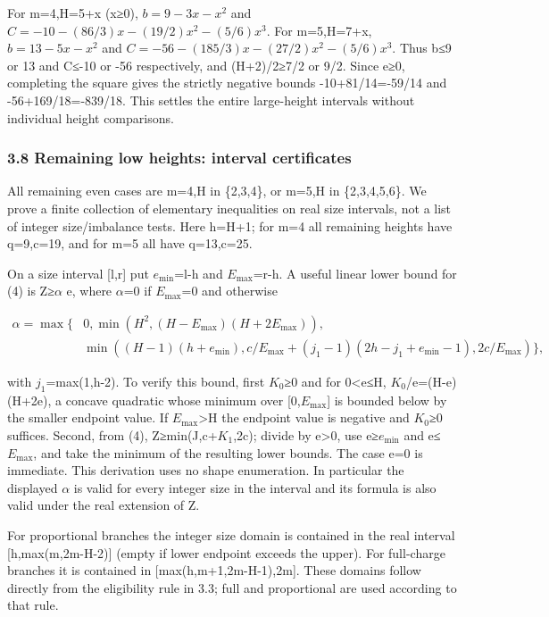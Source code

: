 \documentclass[
  10pt,
  a4paper,
]{article}
\begin{document}
For m=4,H=5+x (x≥0), \(b=9-3x-x^2\) and
\(C=-10-(86/3)x-(19/2)x^2-(5/6)x^3\). For m=5,H=7+x, \(b=13-5x-x^2\) and
\(C=-56-(185/3)x-(27/2)x^2-(5/6)x^3\). Thus b≤9 or 13 and C≤-10 or -56
respectively, and (H+2)/2≥7/2 or 9/2. Since e≥0, completing the square
gives the strictly negative bounds -10+81/14=-59/14 and
-56+169/18=-839/18. This settles the entire large-height intervals
without individual height comparisons.

\subsubsection{3.8 Remaining low heights: interval
certificates}\label{remaining-low-heights-interval-certificates}

All remaining even cases are m=4,H in \{2,3,4\}, or m=5,H in
\{2,3,4,5,6\}. We prove a finite collection of elementary inequalities
on real size intervals, not a list of integer size/imbalance tests. Here
h=H+1; for m=4 all remaining heights have q=9,c=19, and for m=5 all have
q=13,c=25.

On a size interval {[}l,r{]} put \(e_{\min}\)=l-h and \(E_{\max}\)=r-h.
A useful linear lower bound for (4) is Z≥\(\alpha\) e, where
\(\alpha\)=0 if \(E_{\max}\)=0 and otherwise

\[\begin{aligned}\alpha=\max\big\{&0,\min(H^2,(H-E_{\max})(H+2E_{\max})),\\&\min((H-1)(h+e_{\min}),c/E_{\max}+(j_1-1)(2h-j_1+e_{\min}-1),2c/E_{\max})\big\},\end{aligned}\]

with \(j_1\)=max(1,h-2). To verify this bound, first \(K_0\)≥0 and for
0\textless e≤H, \(K_0\)/e=(H-e)(H+2e), a concave quadratic whose minimum
over {[}0,\(E_{\max}\){]} is bounded below by the smaller endpoint
value. If \(E_{\max}\)\textgreater H the endpoint value is negative and
\(K_0\)≥0 suffices. Second, from (4), Z≥min(J,c+\(K_1\),2c); divide by
e\textgreater0, use e≥\(e_{\min}\) and e≤\(E_{\max}\), and take the
minimum of the resulting lower bounds. The case e=0 is immediate. This
derivation uses no shape enumeration. In particular the displayed
\(\alpha\) is valid for every integer size in the interval and its
formula is also valid under the real extension of Z.

For proportional branches the integer size domain is contained in the
real interval {[}h,max(m,2m-H-2){]} (empty if lower endpoint exceeds the
upper). For full-charge branches it is contained in
{[}max(h,m+1,2m-H-1),2m{]}. These domains follow directly from the
eligibility rule in 3.3; full and proportional are used according to
that rule.
\end{document}
